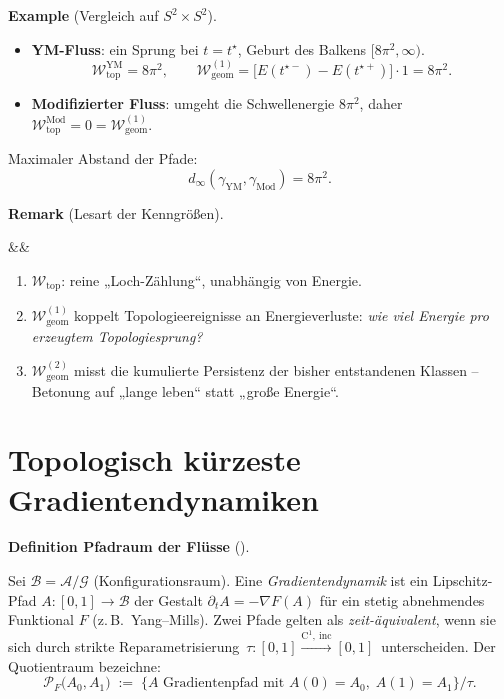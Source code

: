 \documentclass[10pt, letterpaper]{article}
\newenvironment{romanenum}[1][]
  {%
    \ifx&#1&
    \else
      \textbf{#1}\quad
    \fi
    \begin{enumerate}[label=\roman*)]
  }
  {%
    \end{enumerate}%
  }
\newcommand{\CustomHeading}[3]{%
  \par\medskip\noindent%
  \textbf{#1 #2} \textnormal{(#3)}.\enskip%
}
\newenvironment{DEF}[2]{\CustomHeading{Definition}{#1}{#2}}{}
\newenvironment{REM}[2]{\CustomHeading{Remark}{#1}{#2}}{}
\newenvironment{EXA}[2]{\CustomHeading{Example}{#1}{#2}}{}
\begin{document}
\begin{EXA}{}{Vergleich auf $S^{2}\!\times\!S^{2}$}
  \begin{itemize}[leftmargin=1.4em]
    \item \textbf{YM-Fluss}: ein Sprung bei $t=t^\star$,
          Geburt des Balkens $[8\pi^{2},\infty)$.
          \[
            \mathcal W_{\mathrm{top}}^{\mathrm{YM}} = 8\pi^{2},
            \qquad
            \mathcal W_{\mathrm{geom}}^{(1)}
                =\bigl[E(t^{\star -})-E(t^{\star +})\bigr]\cdot 1
                = 8\pi^{2}.
          \]

    \item \textbf{Modifizierter Fluss}: umgeht die
          Schwellenergie $8\pi^{2}$,
          daher
          \(
            \mathcal W_{\mathrm{top}}^{\mathrm{Mod}}=0
            =\mathcal W_{\mathrm{geom}}^{(1)}.
          \)
  \end{itemize}
  Maximaler Abstand der Pfade:
  \[
    d_\infty(\gamma_{\mathrm{YM}},\gamma_{\mathrm{Mod}})=8\pi^{2}.
  \]
\end{EXA}

\begin{REM}{}{Lesart der Kenngrößen}
  \begin{romanenum}
    \item $\mathcal W_{\mathrm{top}}$: reine „Loch-Zählung“,
          unabhängig von Energie.
    \item $\mathcal W_{\mathrm{geom}}^{(1)}$ koppelt
          Topologieereignisse an Energieverluste:
          \emph{wie viel Energie pro erzeugtem Topologie­sprung?}
    \item $\mathcal W_{\mathrm{geom}}^{(2)}$ misst die
          kumulierte Persistenz der bisher entstandenen Klassen
          – Betonung auf „lange leben“ statt „große Energie“.
  \end{romanenum}
\end{REM}





\pagebreak

\section{Topologisch kürzeste Gradientendynamiken}

\begin{DEF}{Pfadraum der Flüsse}{}
  Sei $\mathcal B=\mathcal A/\mathcal G$ (Konfigurationsraum).
  Eine \emph{Gradientendynamik} ist ein Lipschitz-Pfad
  \(
    A:[0,1]\to\mathcal B
  \)
  der Gestalt
  \(
    \partial_t A=-\nabla F(A)
  \)
  für ein stetig abnehmendes Funktional $F$ (z.\,B.\ Yang–Mills).
  Zwei Pfade gelten als \emph{zeit-äquivalent},
  wenn sie sich durch strikte Reparametrisierung
  $\,\tau:[0,1]\xrightarrow{\text{C}^1,\ \mathrm{inc}}[0,1]\,$
  unterscheiden.
  Der Quotientraum bezeichne:
  \[
    \mathscr P_F\bigl(A_0,A_1\bigr)\;:=\;
    \bigl\{A\text{ Gradientenpfad mit }A(0)=A_0,\;A(1)=A_1\bigr\}\bigl/\tau.
  \]
\end{DEF}
\end{document}
